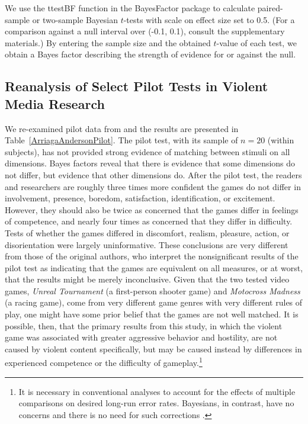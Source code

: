 \documentclass[man]{apa6}
\begin{document}
We use the ttestBF function in the BayesFactor package \citep{Morey:Rouder:2014} to calculate paired-sample or two-sample Bayesian $t$-tests with scale on effect size set to 0.5. (For a comparison against a null interval over (-0.1, 0.1), consult the supplementary materials.) By entering the sample size and the obtained $t$-value of each test, we obtain a Bayes factor describing the strength of evidence for or against the null.  

\subsection{Reanalysis of Select Pilot Tests in Violent Media Research}
We re-examined pilot data from \citet{Arriaga:etal:2008} and the results are presented in Table~\ref{ArriagaAndersonPilot}. The pilot test, with its sample of $n = 20$ (within subjects), has not provided strong evidence of matching between stimuli on all dimensions. Bayes factors reveal that there is evidence that some dimensions do not differ, but evidence that other dimensions do. After the pilot test, the readers and researchers are roughly three times more confident the games do not differ in involvement, presence, boredom, satisfaction, identification, or excitement. However, they should also be twice as concerned that the games differ in feelings of competence, and nearly four times as concerned that they differ in difficulty. Tests of whether the games differed in discomfort, realism, pleasure, action, or disorientation were largely uninformative. These conclusions are very different from those of the original authors, who interpret the nonsignificant results of the pilot test as indicating that the games are equivalent on all measures, or at worst, that the results might be merely inconclusive. Given that the two tested video games, {\em Unreal Tournament} (a first-person shooter game) and {\em Motocross Madness} (a racing game), come from very different game genres with very different rules of play, one might have some prior belief that the games are not well matched.  It is possible, then, that the primary results from this study, in which the violent game was associated with greater aggressive behavior and hostility, 
are not caused by violent content specifically, but may be caused instead by differences in experienced competence or the difficulty of gameplay.\footnote{It is necessary in conventional analyses to account for the effects of multiple comparisons on desired long-run error rates.  Bayesians, in contrast, have no concerns and there is no need for such corrections \citep{Royall:1997,Dienes:2011}.}
\end{document}
